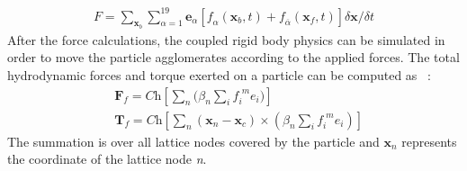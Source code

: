 \begin{align}
\textit{F} = \sum\limits_{\mathbf{x}_{b}}\sum\limits_{\alpha=1}^{19}{\mathbf{e}_{\alpha}[\textit{f}_{\alpha}(\mathbf{x}_{b},t)+\textit{f}_{\overline{\alpha}}(\mathbf{x}_{f},t)] \delta \mathbf{x} / \delta t}
\end{align}
After the force calculations, the coupled rigid body physics can be simulated in order to move the particle agglomerates according to the applied forces. The total hydrodynamic forces and torque exerted on a particle can be computed as ~\citep{cook2004, noble1998}:
\begin{align}
& \mathbf{F}_{f} = \textit{Ch}[\sum\limits_{\textit{n}}{(\beta_{\textit{n}} \sum\limits_{\textit{i}}{\textit{f}_{\textit{i}}^{\textit{ m}}\mathbf{\textit{e}}_{\textit{i}}}})] \\ 
& \mathbf{T}_{f} = \textit{Ch}[\sum\limits_{\textit{n}}{(\mathbf{x}_{\textit{n}}-\mathbf{x}_{\textit{c}}) \times (\beta_{\textit{n}} \sum\limits_{\textit{i}}{\textit{f}_{\textit{i}}^{\textit{ m}}\mathbf{\textit{e}}_{\textit{i}}})}]
\end{align}
The summation is over all lattice nodes covered by the particle and $\mathbf{x}_{\textit{n}}$ represents the coordinate of the lattice node \textit{n}.
